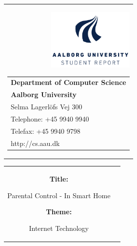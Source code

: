 \thispagestyle{empty}
\begin{titlepage}
	\setcounter{page}{3}
\begin{nopagebreak}
{\samepage 
\begin{tabular}{r}
\parbox{\textwidth}{  \raisebox{-14mm} {\includegraphics[height=3.0cm]{images/aau-stud-logo.pdf}}
\hfill \parbox{4.9cm}{\begin{tabular}{l}
{\sf\small \textbf{Department of Computer Science}}\\
{\sf\small  \textbf{Aalborg University}} \\
{\sf\small Selma Lagerl\"{o}fs Vej 300} \\
{\sf\small Telephone: +45 9940 9940} \\
{\sf\small Telefax:   +45 9940 9798} \\
{\sf\small http://cs.aau.dk}
\end{tabular}}}
\\
\end{tabular}
\vspace{-12pt}
\begin{tabular}{cc}
\parbox{7cm}{
\begin{description}

\item {\bf Title:} 

Parental Control - In Smart Home

\item {\bf Theme:} 

Internet Technology

\end{description}

\parbox{8cm}{

}}
\end{tabular}}
\end{nopagebreak}
\end{titlepage}
